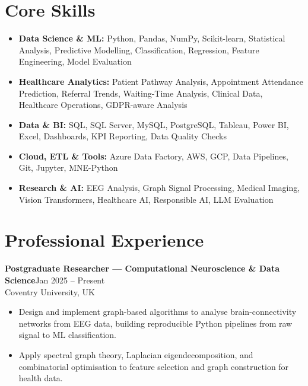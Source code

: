 \documentclass[a4paper,10pt]{article}
\newcommand{\entry}[4]{%
  \noindent\textbf{#1}\hfill{\color{muted}\small #2}\\[-0.2em]
  {\color{accent}\small #3}\\[0.1em]
  #4
}
\begin{document}
\section*{Core Skills}
\begin{itemize}
  \item \textbf{Data Science \& ML:} Python, Pandas, NumPy, Scikit-learn, Statistical Analysis,
        Predictive Modelling, Classification, Regression, Feature Engineering, Model Evaluation
  \item \textbf{Healthcare Analytics:} Patient Pathway Analysis, Appointment Attendance
        Prediction, Referral Trends, Waiting-Time Analysis, Clinical Data, Healthcare
        Operations, GDPR-aware Analysis
  \item \textbf{Data \& BI:} SQL, SQL Server, MySQL, PostgreSQL, Tableau, Power BI, Excel,
        Dashboards, KPI Reporting, Data Quality Checks
  \item \textbf{Cloud, ETL \& Tools:} Azure Data Factory, AWS, GCP, Data Pipelines, Git,
        Jupyter, MNE-Python
  \item \textbf{Research \& AI:} EEG Analysis, Graph Signal Processing, Medical Imaging,
        Vision Transformers, Healthcare AI, Responsible AI, LLM Evaluation
\end{itemize}

\section*{Professional Experience}

\entry{Postgraduate Researcher --- Computational Neuroscience \& Data Science}
      {Jan 2025 -- Present}
      {Coventry University, UK}
      {\begin{itemize}
        \item Design and implement graph-based algorithms to analyse brain-connectivity
              networks from EEG data, building reproducible Python pipelines from raw signal
              to ML classification.
        \item Apply spectral graph theory, Laplacian eigendecomposition, and combinatorial
              optimisation to feature selection and graph construction for health data.
      \end{itemize}}
\vspace{0.5em}
\end{document}
